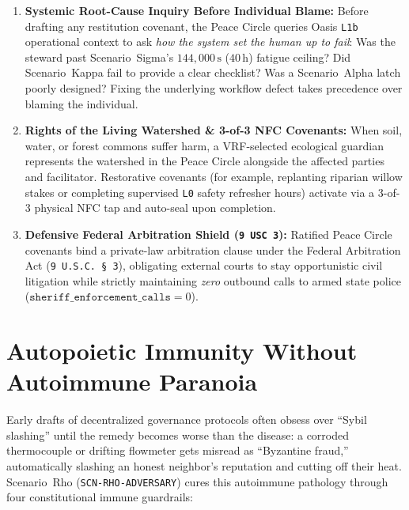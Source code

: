 \begin{enumerate}
    \item \textbf{Systemic Root-Cause Inquiry Before Individual Blame:} Before drafting any
    restitution covenant, the Peace Circle queries Oasis \texttt{L1b} operational context to ask
    \textit{how the system set the human up to fail}: Was the steward past Scenario~Sigma's
    $144{,}000\,\mathrm{s}$ ($40\,\mathrm{h}$) fatigue ceiling? Did Scenario~Kappa fail to provide
    a clear checklist? Was a Scenario~Alpha latch poorly designed? Fixing the underlying workflow
    defect takes precedence over blaming the individual.
    \item \textbf{Rights of the Living Watershed \& 3-of-3 NFC Covenants:} When soil, water, or
    forest commons suffer harm, a VRF-selected ecological guardian represents the watershed in the
    Peace Circle alongside the affected parties and facilitator. Restorative covenants (for example,
    replanting riparian willow stakes or completing supervised \texttt{L0} safety refresher hours)
    activate via a 3-of-3 physical NFC tap and auto-seal upon completion.
    \item \textbf{Defensive Federal Arbitration Shield (\texttt{9 USC 3}):} Ratified Peace Circle
    covenants bind a private-law arbitration clause under the Federal Arbitration Act (\texttt{9 U.S.C.\ \S\,3}),
    obligating external courts to stay opportunistic civil litigation while strictly maintaining
    \textit{zero} outbound calls to armed state police ($\mathtt{sheriff\_enforcement\_calls} = 0$).
\end{enumerate}

\section{Autopoietic Immunity Without Autoimmune Paranoia}
\label{sec:ch7-autopoietic-immunity}

Early drafts of decentralized governance protocols often obsess over ``Sybil slashing'' until the
remedy becomes worse than the disease: a corroded thermocouple or drifting flowmeter gets misread
as ``Byzantine fraud,'' automatically slashing an honest neighbor's reputation and cutting off
their heat. Scenario~Rho (\texttt{SCN-RHO-ADVERSARY}) cures this autoimmune pathology through four
constitutional immune guardrails:

